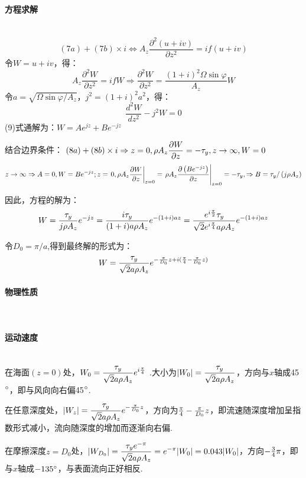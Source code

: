 \documentclass[a4paper,12pt]{article}
\begin{document}
	\paragraph{方程求解}~{}\\
	$$(7a)+(7b)\times{i}\Leftrightarrow{A_{z} \frac{\partial^{2}(u+i v)}{\partial z^{2}}=i f(u+i v)}$$
	\indent
	令$W=u+iv$，得：
	$$A_{z} \frac{\partial^{2} W}{\partial z^{2}}=i f W \Rightarrow
	\frac{\partial^{2} W}{\partial z^{2}}=\frac{(1+i)^{2} \Omega \sin \varphi}{A_{z}} W$$
	\indent
	令$\displaystyle a=\sqrt{\Omega{\sin\varphi}/A_z}\mbox{，}j^2=(1+i)^2a^2$，得：
	\begin{equation}\label{eq4}
		\frac{d^{2} W}{d z^{2}}-j^{2} W=0
	\end{equation}
	\indent
	(9)式通解为：$\displaystyle W = A{e^{jz}} + B{e^{ - jz}}$
	\par
	结合边界条件：
	$\displaystyle (8a)+(8b)\times{i}\Rightarrow{z=0,\rho {A_z}{{\partial W} \over {\partial z}} =  - \tau_y},z\rightarrow\infty,{W=0}$
	\[
	z \rightarrow \infty \Rightarrow{A=0} , W=B e^{-j z}; \\ z=\left.0, \rho A_{z} \frac{\partial W}{\partial z}\right|_{z=0}=\left.\rho A_{z} \frac{\partial\left(B e^{-j z}\right)}{\partial z}\right|_{z=0}=-\tau_y \\, \Rightarrow{B=\tau_y /\left(j \rho A_{z}\right)}
	\]
	\par
	因此，方程的解为：
	\begin{equation*}
	    	W={\tau_y  \over {j\rho {A_z}}}{e^{ - jz}}
	    	 ={{i{\tau _y}} \over {(1 + i)a\rho {A_z}}}{e^{ - (1 + i)az}}
	    	 ={{{e^{i{\pi  \over 2}}}{\tau _y}} \over {\sqrt 2 {e^{i{\pi  \over 4}}}a\rho {A_z}}}{e^{ - (1 + i)az}}
	\end{equation*}
	\par
	令${D_0} = \pi /a$,得到最终解的形式为：
	\begin{equation}
	    W = {{{\tau _y}} \over {\sqrt 2 a\rho {A_z}}}{e^{ - {\pi  \over {{D_0}}}z + i({\pi  \over 4} - {\pi  \over {{D_0}}}z)}}
	\end{equation}
	\paragraph{物理性质}~{}
	\paragraph{运动速度}~{}\\
	在海面$(z=0)$处，$\displaystyle {W_0} = {{{\tau _y}} \over {\sqrt 2 a\rho {A_z}}}{e^{i{\pi  \over 4}}}$
	.大小为$\displaystyle \left|W_0\right| = {{{\tau _y}} \over {\sqrt 2 a\rho {A_z}}}$，方向与$x$轴成45$\degree$，即与风向向右偏45$\degree$.
	\par
	在任意深度处，$\displaystyle |{W_z}| = {{{\tau _y}} \over {\sqrt 2 a\rho {A_z}}}{e^{ - {\pi  \over {{D_0}}}z}}$，方向为${\pi  \over 4} - {\pi  \over {{D_0}}}z$，即流速随深度增加呈指数形式减小，流向随深度的增加而逐渐向右偏.
	\par
	在摩擦深度$z=D_0$处，$\displaystyle |{W_{{D_0}}}| = {{{\tau _y}{e^{ - \pi }}} \over {\sqrt 2 a\rho {A_z}}} = {e^{ - \pi }}|{W_0}| = 0.043|{W_0}|$，方向${ - {3 \over 4}\pi }$，即与$x$轴成$-135\degree$，与表面流向正好相反.
\end{document}
